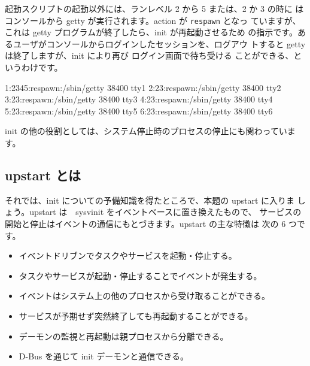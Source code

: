 \documentclass[mingoth,a4paper]{jsarticle}
\begin{document}

起動スクリプトの起動以外には、ランレベル 2 から 5 または、2 か 3 の時に
はコンソールから getty が実行されます。action が \texttt{respawn} となっ
ていますが、これは getty プログラムが終了したら、init が再起動させるため
の指示です。あるユーザがコンソールからログインしたセッションを、ログアウ
トすると getty は終了しますが、init により再び ログイン画面で待ち受ける
ことができる、というわけです。

\begin{commandline}
1:2345:respawn:/sbin/getty 38400 tty1
2:23:respawn:/sbin/getty 38400 tty2
3:23:respawn:/sbin/getty 38400 tty3
4:23:respawn:/sbin/getty 38400 tty4
5:23:respawn:/sbin/getty 38400 tty5
6:23:respawn:/sbin/getty 38400 tty6
\end{commandline}

init の他の役割としては、システム停止時のプロセスの停止にも関わっていま
す。

\subsection{upstart とは}

それでは、init についての予備知識を得たところで、本題の upstart に入りま
しょう。upstart は　sysvinit をイベントベースに置き換えたもので、
サービスの開始と停止はイベントの通信にもとづきます。upstart の主な特徴は
次の 6 つです。

\begin{itemize}
 \item イベントドリブンでタスクやサービスを起動・停止する。
 \item タスクやサービスが起動・停止することでイベントが発生する。
 \item イベントはシステム上の他のプロセスから受け取ることができる。
 \item サービスが予期せず突然終了しても再起動することができる。
 \item デーモンの監視と再起動は親プロセスから分離できる。
 \item D-Bus を通じて init デーモンと通信できる。
\end{itemize}
\end{document}
